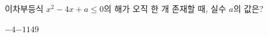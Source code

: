 이차부등식 $x^2-4x+a\le 0$의 해가 오직 한 개 존재할 때, 실수 $a$의 값은?
\begin{choices32}{$-4$}{$-1$}{$1$}{$4$}{$9$}\end{choices32}
